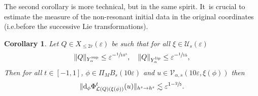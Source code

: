 \documentclass[10pt,a4paper]{amsart}
\providecommand{\ie}{i.e.}
\theoremstyle{plain}
\newtheorem{corollary}[theorem]{Corollary}
\theoremstyle{definition}
\newcommand{\1}{\mathbf{1}}
\newcommand{\Ysup}[1]{Y_{#1}^{\mathrm{sup}}}
\newcommand{\Ylip}[1]{Y_{#1}^{\mathrm{lip}}}
\let\epsilon\varepsilon
\begin{document}
The second corollary is more technical, but in the same spirit. It~is crucial to estimate the measure of the non-resonant initial data in the original coordinates (\ie before the successive Lie transformations).
\begin{corollary}\label{cor:dxi} Let $Q\in X_{\leq2\overline{r}}(\epsilon)$ be such that for all $\xi\in\mathcal{U}_{s}(\epsilon)$
\[
\|Q\|_{\Ysup{\alpha}}\leq\epsilon^{-\sfrac{1}{10^{3}}},\quad \|Q\|_{\Ylip{\alpha}} \leq \epsilon^{-\sfrac{1}{15}},
\]
Then for all $t\in[-1,1]$, $\phi\in\Pi_{M}B_{s}(10\epsilon)$ and $u\in\mathcal{V}_{\alpha,s}(10\epsilon,\xi(\phi))$ then
\begin{equation}
\label{eq:dxi}
\|
\mathrm{d}_{\phi}\Phi^{t}_{\mathcal{L}(Q)(\xi(\phi))}(u)
\|_{h^{s} \to h^{s}}
\lesssim \epsilon^{1-\sfrac{2}{5}}.
\end{equation}
\end{corollary}
\end{document}
